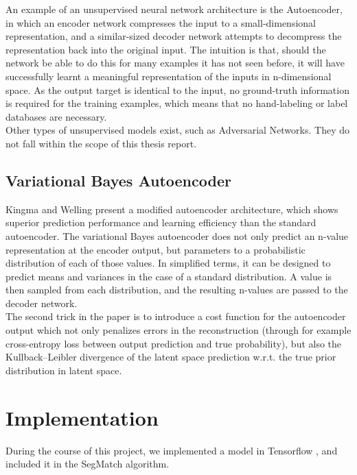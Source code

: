 An example of an unsupervised neural network architecture is the Autoencoder, in which an encoder network compresses the input to a small-dimensional representation, and a similar-sized decoder network attempts to decompress the representation back into the original input. The intuition is that, should the network be able to do this for many examples it has not seen before, it will have successfully learnt a meaningful representation of the inputs in n-dimensional space. As the output target is identical to the input, no ground-truth information is required for the training examples, which means that no hand-labeling or label databases are necessary.\\

Other types of unsupervised models exist, such as Adversarial Networks. They do not fall within the scope of this thesis report.

\subsection{Variational Bayes Autoencoder}
\label{subsec:variational-bayes}

Kingma and Welling \cite{variational-autoencoder} present a modified autoencoder architecture, which shows superior prediction performance and learning efficiency than the standard autoencoder. The variational Bayes autoencoder does not only predict an n-value representation at the encoder output, but parameters to a probabilistic distribution of each of those values. In simplified terms, it can be designed to predict means and variances in the case of a standard distribution. A value is then sampled from each distribution, and the resulting n-values are passed to the decoder network.\\

The second trick in the paper \cite{variational-autoencoder} is to introduce a cost function for the autoencoder output which not only penalizes errors in the reconstruction (through for example cross-entropy loss between output prediction and true probability), but also the Kullback–Leibler divergence of the latent space prediction w.r.t. the true prior distribution in latent space.\\

\section{Implementation}
\label{sec:ae-implementation}

During the course of this project, we implemented a model in Tensorflow \cite{tensorflow}, and included it in the SegMatch algorithm.\\

